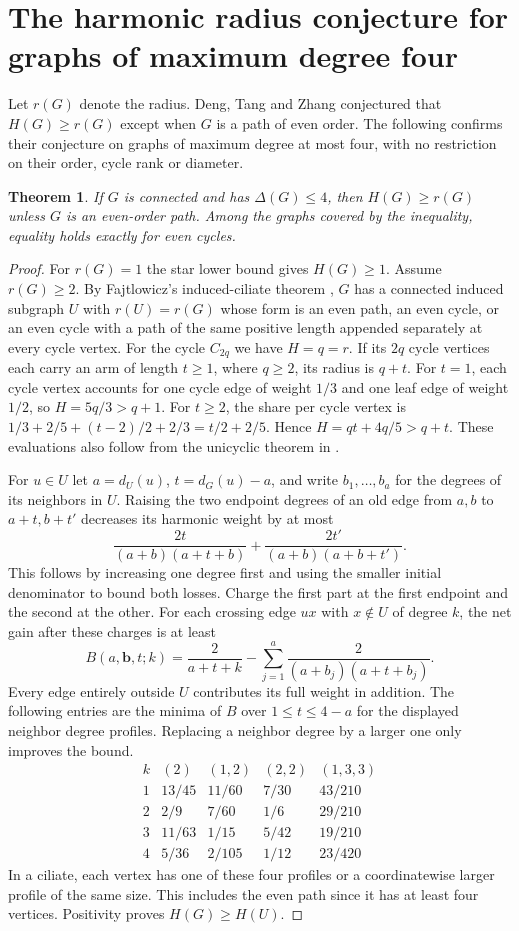 \documentclass[11pt,a4paper]{article}
\newtheorem{theorem}{Theorem}[section]
\begin{document}
\section{The harmonic radius conjecture for graphs of maximum degree four}
Let $r(G)$ denote the radius. Deng, Tang and Zhang \cite[Conj.~6.1]{dtz} conjectured that $H(G)\ge r(G)$
except when $G$ is a path of even order. The following confirms their
conjecture on graphs of maximum degree at most four, with no restriction on
their order, cycle rank or diameter.

\begin{theorem}
If $G$ is connected and has $\Delta(G)\le4$, then $H(G)\ge r(G)$ unless
$G$ is an even-order path. Among the graphs covered by the inequality,
equality holds exactly for even cycles.
\end{theorem}
\begin{proof}
For $r(G)=1$ the star lower bound gives $H(G)\ge1$. Assume $r(G)\ge2$.
By Fajtlowicz's induced-ciliate theorem
\cite[Thm.~2]{ciliate}, $G$ has a
connected induced subgraph $U$ with $r(U)=r(G)$ whose form is an even path, an even cycle, or an even cycle with a path of the
same positive length appended separately at every cycle vertex.
For the cycle $C_{2q}$ we have $H=q=r$. If its $2q$ cycle vertices each carry an arm of length $t\ge1$, where $q\ge2$, its radius is $q+t$. For $t=1$, each cycle vertex accounts for one cycle edge of weight $1/3$ and one leaf edge of weight $1/2$, so $H=5q/3>q+1$. For $t\ge2$, the share per cycle vertex is $1/3+2/5+(t-2)/2+2/3=t/2+2/5$. Hence $H=qt+4q/5>q+t$. These evaluations also follow from the unicyclic theorem in \cite[Thm.~4.1]{dtz}.

For $u\in U$ let $a=d_U(u)$, $t=d_G(u)-a$, and write $b_1,\ldots,b_a$ for
the degrees of its neighbors in $U$. Raising the two endpoint degrees of
an old edge from $a,b$ to $a+t,b+t'$ decreases its harmonic weight by at most
\[
 \frac{2t}{(a+b)(a+t+b)}+\frac{2t'}{(a+b)(a+b+t')}.
\]
This follows by increasing one degree first and using the smaller initial
denominator to bound both losses. Charge the first part at the first
endpoint and the second at the other. For each crossing edge $ux$ with
$x\notin U$ of degree $k$, the net gain after these charges is at least
\[
 B(a,\boldsymbol b,t;k)=\frac{2}{a+t+k}
      -\sum_{j=1}^a\frac{2}{(a+b_j)(a+t+b_j)}.
\]
Every edge entirely outside $U$ contributes its full weight in addition.
The following entries are the minima of $B$ over $1\le t\le4-a$ for the
displayed neighbor degree profiles. Replacing a neighbor degree by a larger
one only improves the bound.
\[
\begin{array}{c|cccc}
 k & (2) & (1,2) & (2,2) & (1,3,3)\\ \hline
 1 &13/45&11/60&7/30&43/210\\
 2 &2/9&7/60&1/6&29/210\\
 3 &11/63&1/15&5/42&19/210\\
 4 &5/36&2/105&1/12&23/420
\end{array}
\]
In a ciliate, each vertex has one of these four profiles or a
coordinatewise larger profile of the same size. This includes the even path
since it has at least four vertices. Positivity proves $H(G)\ge H(U)$.


\end{proof}
\end{document}

